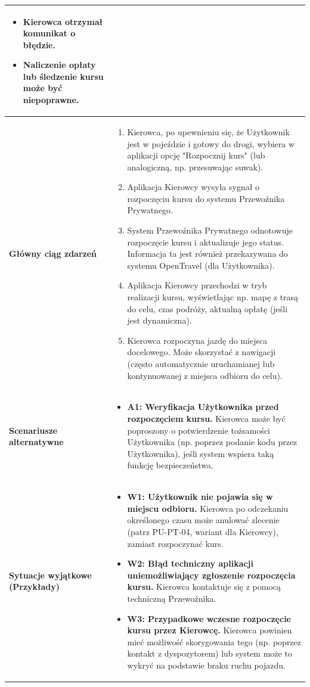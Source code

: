 \documentclass[a4paper,12pt]{article}
\begin{document}
\begin{longtable}{|p{\pierwszakolumnaszerokoscPUTPTRozpoczecie}|p{\drugakolumnaszerokoscPUTPTRozpoczecie}|}
\begin{itemize}
            \item Kierowca otrzymał komunikat o błędzie.
            \item Naliczenie opłaty lub śledzenie kursu może być niepoprawne.
        \end{itemize} \\
    \hline
    \textbf{Główny ciąg zdarzeń} &
        \begin{enumerate} \itemsep0pt \parskip0pt \parsep0pt
            \item Kierowca, po upewnieniu się, że Użytkownik jest w pojeździe i gotowy do drogi, wybiera w aplikacji opcję "Rozpocznij kurs" (lub analogiczną, np. przesuwając suwak).
            \item Aplikacja Kierowcy wysyła sygnał o rozpoczęciu kursu do systemu Przewoźnika Prywatnego.
            \item System Przewoźnika Prywatnego odnotowuje rozpoczęcie kursu i aktualizuje jego status. Informacja ta jest również przekazywana do systemu OpenTravel (dla Użytkownika).
            \item Aplikacja Kierowcy przechodzi w tryb realizacji kursu, wyświetlając np. mapę z trasą do celu, czas podróży, aktualną opłatę (jeśli jest dynamiczna).
            \item Kierowca rozpoczyna jazdę do miejsca docelowego. Może skorzystać z nawigacji (często automatycznie uruchamianej lub kontynuowanej z miejsca odbioru do celu).
        \end{enumerate} \\
    \hline
    \textbf{Scenariusze alternatywne} &
        \begin{itemize} \itemsep0pt \parskip0pt \parsep0pt
            \item \textbf{A1: Weryfikacja Użytkownika przed rozpoczęciem kursu.} Kierowca może być poproszony o potwierdzenie tożsamości Użytkownika (np. poprzez podanie kodu przez Użytkownika), jeśli system wspiera taką funkcję bezpieczeństwa.
        \end{itemize} \\
    \hline
    \textbf{Sytuacje wyjątkowe (Przykłady)} &
        \begin{itemize} \itemsep0pt \parskip0pt \parsep0pt
            \item \textbf{W1: Użytkownik nie pojawia się w miejscu odbioru.} Kierowca po odczekaniu określonego czasu może anulować zlecenie (patrz PU-PT-04, wariant dla Kierowcy), zamiast rozpoczynać kurs.
            \item \textbf{W2: Błąd techniczny aplikacji uniemożliwiający zgłoszenie rozpoczęcia kursu.} Kierowca kontaktuje się z pomocą techniczną Przewoźnika.
            \item \textbf{W3: Przypadkowe wczesne rozpoczęcie kursu przez Kierowcę.} Kierowca powinien mieć możliwość skorygowania tego (np. poprzez kontakt z dyspozytorem) lub system może to wykryć na podstawie braku ruchu pojazdu.
        \end{itemize} \\
\end{longtable}
\endgroup
\end{document}
